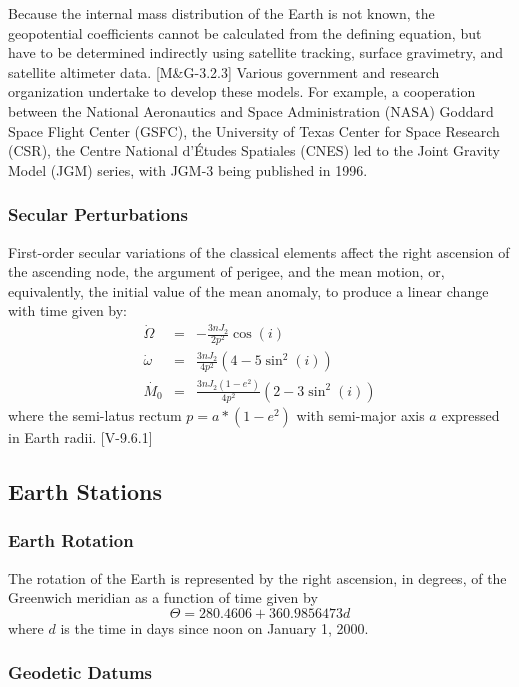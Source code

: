 \documentclass[11pt]{article}
\begin{document}
Because the internal mass distribution of the Earth is
not known, the geopotential coefficients cannot be calculated from the
defining equation, but have to be determined indirectly using
satellite tracking, surface gravimetry, and satellite altimeter
data. [M\&G-3.2.3] Various government and research organization undertake to
develop these models. For example, a cooperation between the National
Aeronautics and Space Administration (NASA) Goddard Space Flight
Center (GSFC), the University of Texas Center for Space Research
(CSR), the Centre National d'\'{E}tudes Spatiales (CNES) led to the
Joint Gravity Model (JGM) series, with JGM-3 being published in 1996.

\subsubsection{Secular Perturbations}

First-order secular variations of the classical elements
affect the right ascension of the ascending node, the argument of
perigee, and the mean motion, or, equivalently, the initial value of
the mean anomaly, to produce a linear change with time given by:
\begin{eqnarray}
  \dot{\Omega} &=& -\frac{3nJ_2}{2p^2}\cos(i) \\
  \dot{\omega} &=& \frac{3nJ_2}{4p^2}(4 - 5\sin^2(i)) \\
  \dot{M_0} &=& \frac{3nJ_2(1 - e^2)}{4p^2}(2 - 3\sin^2(i))
\end{eqnarray}
where the semi-latus rectum $p = a * (1 - e^2)$ with semi-major axis
$a$ expressed in Earth radii. [V-9.6.1]

\subsection{Earth Stations}

\subsubsection{Earth Rotation}

The rotation of the Earth is represented by the right ascension, in
degrees, of the Greenwich meridian as a function of time given by
\begin{equation}
  \Theta = 280.4606 + 360.9856473d
\end{equation}
where $d$ is the time in days since noon on January 1, 2000.

\subsubsection{Geodetic Datums}
\end{document}
